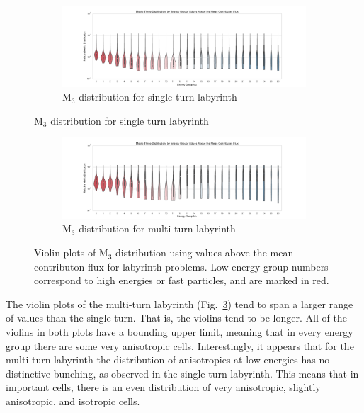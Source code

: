 \begin{figure}[htb!]
  \centering
  \begin{subfigure}[t]{\textwidth}
    \includegraphics[width=\linewidth]{./chapters/characterization_probs/figures/char/maze2/metric_three_violin_mean.pdf}
    \caption{M$_{3}$ distribution for single turn labyrinth}
    \label{fig:maze2M3violins}
  \end{subfigure}
\end{figure}
\begin{figure}[htb!]\ContinuedFloat
  \centering
  \begin{subfigure}[t]{\textwidth}
    \includegraphics[width=\linewidth]{./chapters/characterization_probs/figures/char/maze1/metric_three_violin_mean.pdf}
    \caption{M$_3$ distribution for multi-turn labyrinth}
    \label{fig:maze1M3violins}
  \end{subfigure}
  \caption[Violin plots of M$_{3}$ distribution using values above the mean
  contributon flux for labyrinth problems.]
  {Violin plots of M$_{3}$ distribution using values above the mean
  contributon flux for labyrinth problems. Low energy group numbers correspond
  to high energies or fast particles, and are marked in red.}
  \label{fig:labyrinthviolins}
\end{figure}

The violin plots of the multi-turn labyrinth (Fig.~\ref{fig:maze1M3violins})
tend to span a larger range of values than the single turn. That is, the violins tend to be longer.
All of the violins in both plots have a bounding upper limit, meaning that in
every energy group there are some very anisotropic cells. 
Interestingly, it
appears that for the multi-turn labyrinth the distribution of anisotropies at
low energies has no distinctive bunching, as observed in the single-turn
labyrinth. This means that in important cells, there is an even distribution of
very anisotropic, slightly anisotropic, and isotropic cells.

